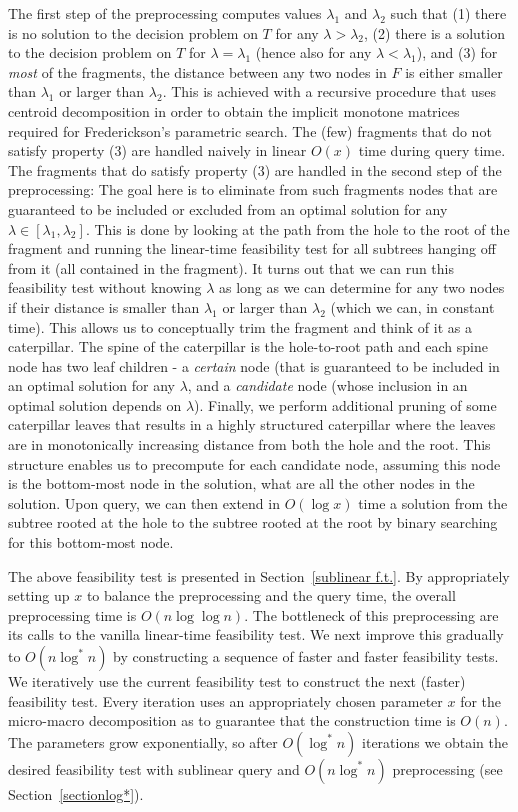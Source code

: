 \documentclass[11pt,a4paper]{article}
\theoremstyle{definition}
\theoremstyle{remark}
\begin{document}
The first step of the preprocessing computes values $\lambda_1$ and  $\lambda_2$ such that (1) there is no solution to the decision problem on $T$ for any $\lambda > \lambda_2$, (2) there is a solution to the decision problem on $T$ for $\lambda = \lambda_1$ (hence also for any $\lambda < \lambda_1$), and (3) for {\em most} of the fragments, the distance between any two nodes in $F$ is either smaller than $\lambda_1$ or larger than $\lambda_2$. This is achieved with a recursive procedure that uses centroid decomposition in order to obtain the implicit monotone matrices required for Frederickson's parametric search. The (few) fragments that do not satisfy property (3) are handled naively in linear $O(x)$ time during query time. The fragments that do satisfy property (3) are handled in the second step of the preprocessing: The goal here is to eliminate from such fragments nodes that are guaranteed to be included or excluded from an optimal solution for any $\lambda \in [\lambda_1,\lambda_2]$. This is done by looking at the path from the hole to the root of the fragment and running the linear-time feasibility test for all subtrees hanging off from it (all contained in the fragment). It turns out that we can run this feasibility test without knowing $\lambda$ as long as we can determine for any two nodes if their distance is smaller than $\lambda_1$ or larger than $\lambda_2$ (which we can, in constant time). This allows us to conceptually trim the fragment and think of it as a caterpillar. The spine of the caterpillar is the hole-to-root path and each spine node has two leaf children - a \emph{certain} node (that is guaranteed to be included in an optimal solution for any $\lambda$, and a \emph{candidate} node (whose inclusion in an optimal solution depends on $\lambda$). Finally, we perform additional pruning of some caterpillar leaves that results in a highly structured caterpillar where the leaves are in monotonically increasing distance from both the hole and the root. This structure enables us to precompute for each candidate node, assuming this node is the bottom-most node in the solution, what are all the other nodes in the solution. Upon query, we can then extend in $O(\log x)$ time a solution from the subtree rooted at the hole to the subtree rooted at the root by  binary searching for this bottom-most node. 

The above feasibility test is presented in Section~\ref{sublinear f.t.}. By appropriately setting up $x$ to balance the preprocessing and the query time, the overall preprocessing time is $O(n\log\log n)$. The bottleneck of this preprocessing are its calls to the vanilla linear-time feasibility test.  
We next improve this gradually to $O(n\log^* n)$ by constructing a sequence of faster and faster feasibility tests. 
We iteratively use the current feasibility test to construct the next (faster) feasibility test.
Every iteration uses an appropriately chosen parameter $x$ for the micro-macro decomposition
as to guarantee that the construction time is $O(n)$. The parameters grow exponentially,
so after $O(\log^{*}n)$ iterations we obtain the desired  feasibility test with sublinear query and $O(n\log^* n)$ preprocessing (see Section~\ref{sectionlog*}). 
\end{document}

